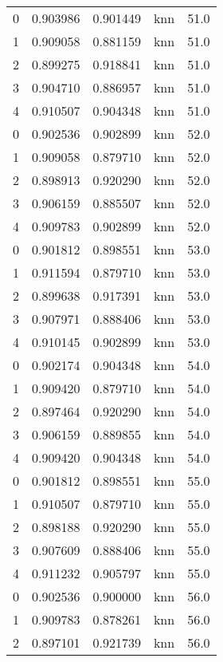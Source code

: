 \begin{tabular}{rrrlr}
     0 & 0.903986 & 0.901449 &      knn &       51.0 \\
     1 & 0.909058 & 0.881159 &      knn &       51.0 \\
     2 & 0.899275 & 0.918841 &      knn &       51.0 \\
     3 & 0.904710 & 0.886957 &      knn &       51.0 \\
     4 & 0.910507 & 0.904348 &      knn &       51.0 \\
     0 & 0.902536 & 0.902899 &      knn &       52.0 \\
     1 & 0.909058 & 0.879710 &      knn &       52.0 \\
     2 & 0.898913 & 0.920290 &      knn &       52.0 \\
     3 & 0.906159 & 0.885507 &      knn &       52.0 \\
     4 & 0.909783 & 0.902899 &      knn &       52.0 \\
     0 & 0.901812 & 0.898551 &      knn &       53.0 \\
     1 & 0.911594 & 0.879710 &      knn &       53.0 \\
     2 & 0.899638 & 0.917391 &      knn &       53.0 \\
     3 & 0.907971 & 0.888406 &      knn &       53.0 \\
     4 & 0.910145 & 0.902899 &      knn &       53.0 \\
     0 & 0.902174 & 0.904348 &      knn &       54.0 \\
     1 & 0.909420 & 0.879710 &      knn &       54.0 \\
     2 & 0.897464 & 0.920290 &      knn &       54.0 \\
     3 & 0.906159 & 0.889855 &      knn &       54.0 \\
     4 & 0.909420 & 0.904348 &      knn &       54.0 \\
     0 & 0.901812 & 0.898551 &      knn &       55.0 \\
     1 & 0.910507 & 0.879710 &      knn &       55.0 \\
     2 & 0.898188 & 0.920290 &      knn &       55.0 \\
     3 & 0.907609 & 0.888406 &      knn &       55.0 \\
     4 & 0.911232 & 0.905797 &      knn &       55.0 \\
     0 & 0.902536 & 0.900000 &      knn &       56.0 \\
     1 & 0.909783 & 0.878261 &      knn &       56.0 \\
     2 & 0.897101 & 0.921739 &      knn &       56.0 \\

\end{tabular}
